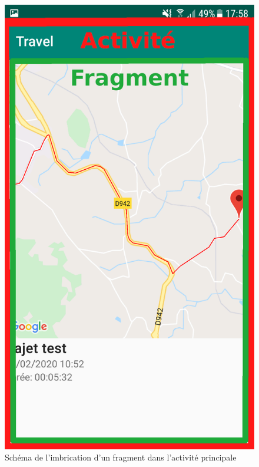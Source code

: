 \documentclass{article}
\begin{document}
\begin{figure}[ht]
  \label{Activité-Fragment}
  \centering
  \includegraphics[scale=0.13]{images/activity-fragment.png}
  \caption{Schéma de l'imbrication d'un fragment dans l'activité principale}
\end{figure}
\end{document}
